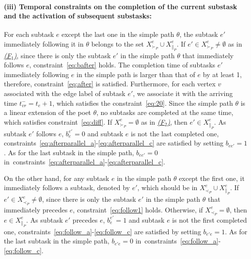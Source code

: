 \documentclass[Afour,sageh,times]{sagej}
\begin{document}
{{\paragraph{(iii) Temporal constraints on the completion of the
current substask and the activation of subsequent
substasks:}
For each subtask $e$ except the last one in the simple path $\theta$, the subtask $e'$ immediately following it in $\theta$ belongs to the set $X_{\succ_P}^e \cup X_{\|_P}^e$. If $e' \in X_{\succ_P}^e \neq \emptyset$ as in \hyperref[activation:a]{\it (F$_1$)}, since there is only the subtask $e'$ in the simple path $\theta$ that immediately follows $e$, constraint~\eqref{eq:bafter} holds. The completion time  of subtasks $e'$ immediately following  $e$ in the simple path is larger than that of $e$ by at least 1, therefore, constraint~\eqref{eq:after} is satisfied. %
Furthermore, for each vertex $v$ associated with the edge label of subtask $e'$, we associate it with the arriving time $t_{vr}^- = t_{e}+1$, which satisfies the constraint~\eqref{eq:20}. Since the simple path $\theta$ is a linear extension of the poet $\theta$, no subtasks are completed at the same time, which satisfies constraint~\eqref{eq:diff}. If $X_{\succ_P}^e = \emptyset$ as in \hyperref[activation:b]{\it (F$_2$)}, then $e' \in X_{\|_P}^e$. As subtask $e'$ follows $e$, $b_e^{e'}=0$ and  subtask $e$ is not the last completed one, constraints~\eqref{eq:afterparallel_a}-\eqref{eq:afterparallel_c} are satisfied by setting $b_{ee'}=1$.  As for the last subtask in the simple path, $b_{ee'}=0$  in~constraints~\eqref{eq:afterparallel_a}-\eqref{eq:afterparallel_c}.

On the other hand, for any subtask $e$ in the simple path $\theta$ except the first one, it immediately follows a subtask, denoted by $e'$, which should be in $X_{\prec_P}^e \cup X_{\|_P}^e$. If $e'\in  X_{\prec_P}^e \neq \emptyset$, since there is only the subtask $e'$ in the simple path $\theta$ that immediately precedes $e$, constraint~\eqref{eq:follow1} holds. Otherwise, if $X_{\prec_P}^e = \emptyset$, then $e \in X_{\|_P}^e$. As subtask $e'$ precedes $e$, $b_e^{e'}=1$ and subtask $e$ is not the first completed one, constraints~\eqref{eq:follow_a}-\eqref{eq:follow_c} are satisfied by setting $b_{e'e}=1$.  As for the last subtask in the simple path, $b_{e'e}=0$ in~constraints~\eqref{eq:follow_a}-\eqref{eq:follow_c}.

}}
\end{document}

